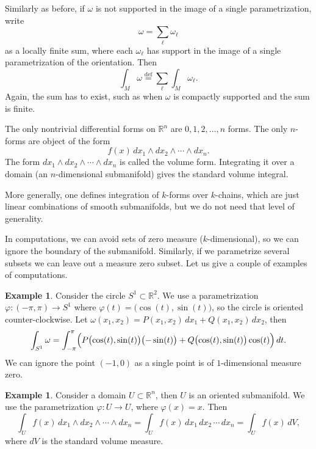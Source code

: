\documentclass[12pt,openany]{book}
\newcommand{\R}{{\mathbb{R}}}
\theoremstyle{plain}
\theoremstyle{remark}
\theoremstyle{definition}
\theoremstyle{exercise}
\theoremstyle{example}
\newtheorem{example}[thm]{Example}
\begin{document}
Similarly as before, if $\omega$ is not supported in the
image of a single parametrization, write
\begin{equation*}
\omega = \sum_{\ell} \omega_\ell
\end{equation*}
as a locally finite sum,
where each $\omega_\ell$ has support in the image of a single
parametrization of the orientation.
Then
\begin{equation*}
\int_M \omega
\overset{\text{def}}{=}
\sum_{\ell}
\int_M \omega_\ell .
\end{equation*}
Again, the sum has to exist, such as when $\omega$ is compactly supported
and the sum is finite.

The only nontrivial differential forms on $\R^n$
are $0,1,2,\ldots,n$ forms.  The only $n$-forms are
object of the form
\begin{equation*}
f(x) \,
dx_1 \wedge dx_2 \wedge \cdots \wedge dx_n .
\end{equation*}
The form $dx_1 \wedge dx_2 \wedge \cdots \wedge dx_n$ is called the
volume form.  Integrating it over a domain (an $n$-dimensional submanifold)
gives the standard volume integral.

More generally, one defines integration of $k$-forms over $k$-chains,
which are just linear combinations of smooth submanifolds, but we do not
need that level of generality.

\medskip

In computations, we can avoid sets of zero measure ($k$-dimensional),
so we can ignore the boundary of the submanifold.  Similarly, if we parametrize
several subsets we can leave out a measure zero subset.
Let us give a couple of examples of computations.

\begin{example} \label{example:diffformscircleint}
Consider the circle $S^1 \subset
\R^2$.  We use a parametrization $\varphi \colon (-\pi,\pi) \to S^1$
where $\varphi(t) = \bigl(\cos(t),\sin(t)\bigr)$, so the circle is oriented
counter-clockwise.
Let $\omega(x_1,x_2) = P(x_1,x_2) \, dx_1 + Q(x_1,x_2) \, dx_2$, then
\begin{equation*}
\int_{S^1} \omega =
\int_{-\pi}^{\pi}
\Bigl(
P\bigl(\cos(t),\sin(t)\bigr) \bigl(-\sin(t)\bigr)  +
Q\bigl(\cos(t),\sin(t)\bigr) \cos(t) \Bigr) \, dt .
\end{equation*}
We can ignore the point $(-1,0)$ as a single point is of $1$-dimensional
measure zero.
\end{example}

\begin{example}
Consider a domain $U \subset \R^n$, then $U$ is an oriented submanifold.
We use the parametrization $\varphi \colon U \to U$, where $\varphi(x) =
x$.  Then
\begin{equation*}
\int_U f(x) \, dx_1 \wedge dx_2 \wedge \cdots \wedge dx_n
=
\int_U f(x) \, dx_1 \, dx_2 \,  \cdots \, dx_n
=
\int_U f(x) \, dV ,
\end{equation*}
where $dV$ is the standard volume measure.
\end{example}
\end{document}
